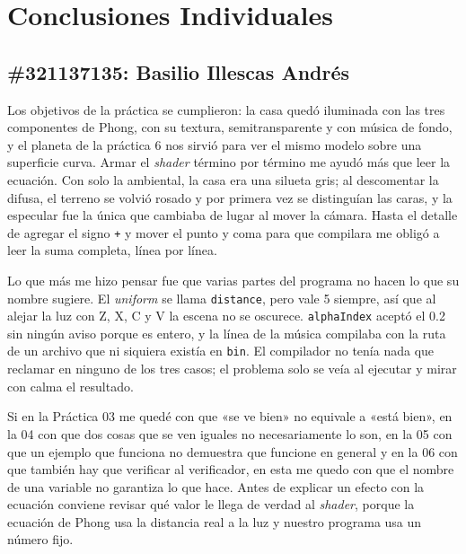 
\section{Conclusiones Individuales}

\subsection*{\#321137135: Basilio Illescas Andrés}
Los objetivos de la práctica se cumplieron: la casa quedó iluminada con las tres componentes de Phong, con su textura, semitransparente y con música de fondo, y el planeta de la práctica 6 nos sirvió para ver el mismo modelo sobre una superficie curva. Armar el \textit{shader} término por término me ayudó más que leer la ecuación. Con solo la ambiental, la casa era una silueta gris; al descomentar la difusa, el terreno se volvió rosado y por primera vez se distinguían las caras, y la especular fue la única que cambiaba de lugar al mover la cámara. Hasta el detalle de agregar el signo \texttt{+} y mover el punto y coma para que compilara me obligó a leer la suma completa, línea por línea.

Lo que más me hizo pensar fue que varias partes del programa no hacen lo que su nombre sugiere. El \textit{uniform} se llama \texttt{distance}, pero vale 5 siempre, así que al alejar la luz con Z, X, C y V la escena no se oscurece. \texttt{alphaIndex} aceptó el 0.2 sin ningún aviso porque es entero, y la línea de la música compilaba con la ruta de un archivo que ni siquiera existía en \texttt{bin}. El compilador no tenía nada que reclamar en ninguno de los tres casos; el problema solo se veía al ejecutar y mirar con calma el resultado.

Si en la Práctica 03 me quedé con que «se ve bien» no equivale a «está bien», en la 04 con que dos cosas que se ven iguales no necesariamente lo son, en la 05 con que un ejemplo que funciona no demuestra que funcione en general y en la 06 con que también hay que verificar al verificador, en esta me quedo con que el nombre de una variable no garantiza lo que hace. Antes de explicar un efecto con la ecuación conviene revisar qué valor le llega de verdad al \textit{shader}, porque la ecuación de Phong usa la distancia real a la luz y nuestro programa usa un número fijo.

